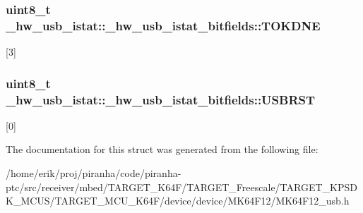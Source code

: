 \subsubsection[{\texorpdfstring{T\+O\+K\+D\+NE}{TOKDNE}}]{\setlength{\rightskip}{0pt plus 5cm}uint8\+\_\+t \+\_\+hw\+\_\+usb\+\_\+istat\+::\+\_\+hw\+\_\+usb\+\_\+istat\+\_\+bitfields\+::\+T\+O\+K\+D\+NE}\hypertarget{struct__hw__usb__istat_1_1__hw__usb__istat__bitfields_a2288e8892239050dd911fb41b95c00a0}{}\label{struct__hw__usb__istat_1_1__hw__usb__istat__bitfields_a2288e8892239050dd911fb41b95c00a0}
\mbox{[}3\mbox{]} 
\subsubsection[{\texorpdfstring{U\+S\+B\+R\+ST}{USBRST}}]{\setlength{\rightskip}{0pt plus 5cm}uint8\+\_\+t \+\_\+hw\+\_\+usb\+\_\+istat\+::\+\_\+hw\+\_\+usb\+\_\+istat\+\_\+bitfields\+::\+U\+S\+B\+R\+ST}\hypertarget{struct__hw__usb__istat_1_1__hw__usb__istat__bitfields_a6876f83efa62137d30fa1616f3a3d410}{}\label{struct__hw__usb__istat_1_1__hw__usb__istat__bitfields_a6876f83efa62137d30fa1616f3a3d410}
\mbox{[}0\mbox{]} 

The documentation for this struct was generated from the following file\+:\begin{DoxyCompactItemize}
\item 
/home/erik/proj/piranha/code/piranha-\/ptc/src/receiver/mbed/\+T\+A\+R\+G\+E\+T\+\_\+\+K64\+F/\+T\+A\+R\+G\+E\+T\+\_\+\+Freescale/\+T\+A\+R\+G\+E\+T\+\_\+\+K\+P\+S\+D\+K\+\_\+\+M\+C\+U\+S/\+T\+A\+R\+G\+E\+T\+\_\+\+M\+C\+U\+\_\+\+K64\+F/device/device/\+M\+K64\+F12/M\+K64\+F12\+\_\+usb.\+h\end{DoxyCompactItemize}
